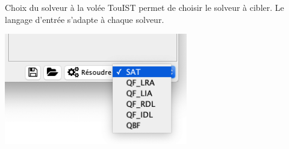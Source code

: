 \documentclass[english,french,usenames,dvipsnames]{beamer}
\begin{document}
\begin{frame}{\subsecname}
\begin{block}{Choix du solveur à la volée}
TouIST permet de choisir le solveur à cibler. Le langage d'entrée s'adapte à chaque solveur.
\end{block}
\begin{center}\includegraphics[width=0.6\textwidth]{figures/touist-selecteur.png}\end{center}
\end{frame}
\end{document}
